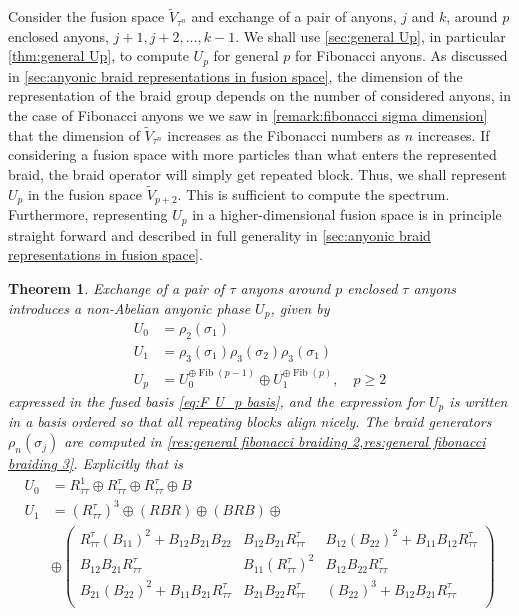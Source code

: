 \documentclass[a4paper,10pt,oneside]{book}
\theoremstyle{plain}
\newtheorem{theorem}{Theorem}[section]
\theoremstyle{definition}
\theoremstyle{remark}
\DeclareMathOperator{\Fib}{Fib}
\begin{document}
Consider the fusion space $\widetilde{V}_{τ^n}$ and exchange of a pair of anyons, $j$ and $k$, around $p$ enclosed anyons, $j+1, j+2, \ldots, k-1$.
We shall use \cref{sec:general Up}, in particular \cref{thm:general Up}, to compute $U_p$ for general $p$ for Fibonacci anyons. As discussed in \cref{sec:anyonic braid representations in fusion space}, the dimension of the representation of the braid group depends on the number of considered anyons, in the case of Fibonacci anyons we we saw in \cref{remark:fibonacci sigma dimension} that the dimension of $\widetilde{V}_{τ^n}$ increases as the Fibonacci numbers as $n$ increases. If considering a fusion space with more particles than what enters the represented braid, the braid operator will simply get repeated block. Thus, we shall represent $U_p$ in the fusion space $\widetilde{V}_{p+2}$. This is sufficient to compute the spectrum. Furthermore, representing $U_p$ in a higher-dimensional fusion space is in principle straight forward and described in full generality in \cref{sec:anyonic braid representations in fusion space}.

\begin{theorem}\label{thm:fibonacci U_p}
  Exchange of a pair of $τ$ anyons around $p$ enclosed $τ$ anyons introduces a non-Abelian anyonic phase $U_p$, given by
  \begin{equation}
    \begin{aligned}
      U_0 &= ρ_2(σ_1) \\
      U_1 &= ρ_3(σ_1) ρ_3(σ_2) ρ_3(σ_1) \\
      U_p &= U_0^{\oplus\Fib(p-1)} \oplus U_1^{\oplus\Fib(p)}, \quad p \ge 2
    \end{aligned}
  \end{equation}
  expressed in the fused basis \cref{eq:F U_p basis}, and the expression for $U_p$ is written in a basis ordered so that all repeating blocks align nicely. The braid generators $ρ_n(σ_j)$ are computed in \cref{res:general fibonacci braiding 2,res:general fibonacci braiding 3}.
  Explicitly that is
  \begin{equation}
    \begin{aligned}
      U_0 &= R_{ττ}^1 \oplus R_{ττ}^τ \oplus R_{ττ}^τ \oplus B \\
      U_1 &= \left( R_{ττ}^τ \right)^3 \oplus \left( RBR \right) \oplus \left( BRB \right)
      \oplus \\
      & \oplus
      \begin{pmatrix}
        R_{\tau\tau}^\tau \left(B_{11}\right)^2+B_{12} B_{21} B_{22} & B_{12} B_{21} R_{\tau\tau}^\tau & B_{12} \left(B_{22}\right)^2+B_{11} B_{12} R_{\tau\tau}^\tau \\
        B_{12} B_{21} R_{\tau\tau}^\tau & B_{11} \left(R_{\tau\tau}^\tau\right)^2 & B_{12} B_{22} R_{\tau\tau}^\tau \\
        B_{21} \left(B_{22}\right)^2+B_{11} B_{21} R_{\tau\tau}^\tau & B_{21} B_{22} R_{\tau\tau}^\tau & \left(B_{22}\right)^3+B_{12} B_{21} R_{\tau\tau}^\tau \\
      \end{pmatrix}
    \end{aligned}
  \end{equation}
\end{theorem}
\end{document}
